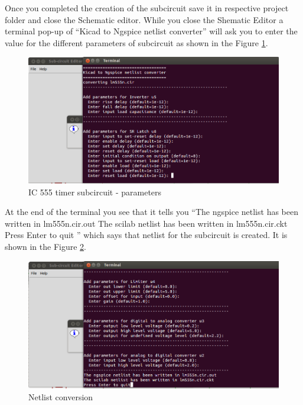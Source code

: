 Once you completed the creation of the subcircuit save it in respective project folder and close the Schematic editor. While you close the Shematic Editor a terminal pop-up of “Kicad to Ngspice netlist converter” will ask you to enter the value for the different parameters of subcircuit as shown in the Figure \ref{para}.

\begin{figure}[h]%
\begin{center}
\includegraphics[width=1\linewidth]{figures/subcircuit-parameters.png}%
\caption{IC 555 timer subcircuit - parameters}
\label{para}
\end{center}
\end{figure}

At the end of the terminal you see that it tells you 
“The ngspice netlist has been written in lm555n.cir.out 
The scilab netlist has been written in lm555n.cir.ckt 
Press Enter to quit ” which says that netlist for the subcircuit is created. It is shown in the Figure \ref{net}.

\begin{figure}[h]%
\begin{center}
\includegraphics[width=1\linewidth]{figures/netlist-generation.png}%
\caption{Netlist conversion}
\label{net}
\end{center}
\end{figure}

